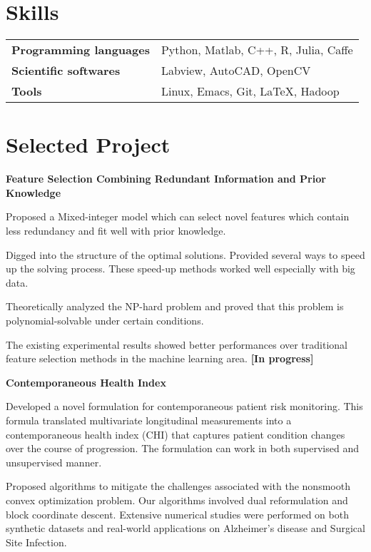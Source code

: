 \documentclass[margin,line,11pt]{resume}
\begin{document}
\begin{resume}
 \section{\mysidestyle Skills}
\vspace{0.5em}
	\begin{tabular}{ll }
\textbf{Programming languages} &Python, Matlab, C++, R, Julia, Caffe\\
\textbf{Scientific softwares}& Labview,  AutoCAD, OpenCV\\
	\textbf{Tools}& Linux, Emacs, Git, \LaTeX, Hadoop
        \end{tabular}

\clearpage        

\section{\mysidestyle Selected Project}

        \textbf{Feature Selection Combining Redundant Information and Prior Knowledge}
\begin{list2}        
\item Proposed a Mixed-integer model which can select novel features which contain less redundancy and fit well with prior knowledge.
\item Digged into the structure of the optimal solutions. Provided several ways to speed up the solving process.  These speed-up methods worked well especially with big data.
\item Theoretically analyzed the NP-hard problem and proved  that this problem is polynomial-solvable under certain conditions. 
\item The existing experimental results showed better performances over traditional feature selection methods in the machine learning area. \textbf{[In progress]}
\end{list2}

\textbf{Contemporaneous Health Index}
\begin{list2}        
\item Developed a novel formulation for contemporaneous patient risk monitoring. This formula translated multivariate longitudinal measurements into a contemporaneous health index (CHI) that captures patient condition changes over the course of progression. The formulation can work in both supervised and unsupervised manner. 
\item Proposed  algorithms to mitigate the challenges associated with the nonsmooth convex optimization problem. Our algorithms involved dual reformulation and block coordinate descent. Extensive numerical studies were performed on both synthetic datasets and real-world applications on Alzheimer's disease and Surgical Site Infection.
\end{list2}


\end{resume}
\end{document}
